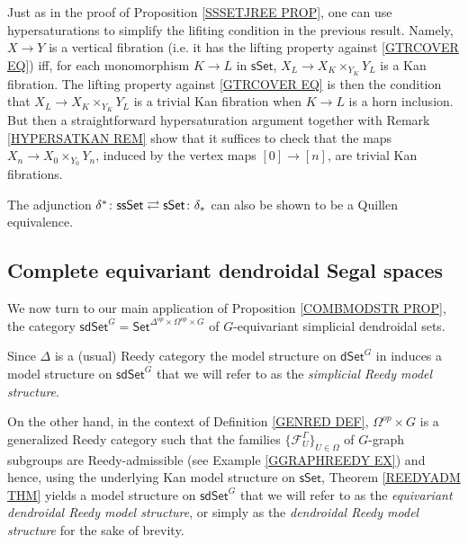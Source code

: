 \documentclass[a4paper,10pt
,draft
]{article}%
\begin{document}
\begin{remark}\label{HYPERSIMPL REM}
	Just as in the proof of Proposition \ref{SSSETJREE PROP}, one can use hypersaturations to simplify the lifiting condition
	in the previous result. 
	Namely,	$X \to Y$ is a vertical fibration (i.e. it has the lifting property against \eqref{GTRCOVER EQ})
	iff, for each monomorphism $K \to L$ in $\mathsf{sSet}$,
	$X_L \to X_K \times_{Y_K} Y_L$
	is a Kan fibration.
	The lifting property against \eqref{GTRCOVER EQ}
	is then the condition that 
	$X_L \to X_K \times_{Y_K} Y_L$ is a trivial Kan fibration
	when $K \to L$ is a horn inclusion. But then a straightforward hypersaturation argument together with Remark \ref{HYPERSATKAN REM} show that it suffices to check that the maps $X_n \to X_0 \times_{Y_0} Y_n$, induced by the vertex maps $[0] \to [n]$, are trivial Kan fibrations.
\end{remark}


\begin{remark}
The adjunction 
$
	\delta^{\**}\colon \mathsf{ssSet}
		\rightleftarrows 
	\mathsf{sSet} \colon \delta_{\**}
$
can also be shown to be a Quillen equivalence.
\end{remark}


\subsection{Complete equivariant dendroidal Segal spaces}
\label{CEDSS SEC}


We now turn to our main application of Proposition \ref{COMBMODSTR PROP}, the category 
$\mathsf{sdSet}^G = \mathsf{Set}^{\Delta^{op} \times \Omega^{op} \times G}$
of $G$-equivariant simplicial dendroidal sets.

Since $\Delta$ is a (usual) Reedy category the model structure on $\mathsf{dSet}^G$ 
in \cite[Thm. 2.1]{Per17} induces 
a model structure on $\mathsf{sdSet}^G$
that we will refer to as the \textit{simplicial Reedy model structure}.

On the other hand, in the context of Definition \ref{GENRED DEF},
$\Omega^{op} \times G$ is a generalized Reedy category such that the families $\{\mathcal{F}_{U}^{\Gamma}\}_{U \in \Omega}$
of $G$-graph subgroups are Reedy-admissible 
(see Example \ref{GGRAPHREEDY EX})
and hence, using the underlying 
Kan model structure on $\mathsf{sSet}$, 
Theorem \ref{REEDYADM THM} yields
a model structure on $\mathsf{sdSet}^G$
that we will refer to as the \textit{equivariant dendroidal Reedy model structure}, 
or simply as the \textit{dendroidal Reedy model structure} for the sake of brevity.
\end{document}
